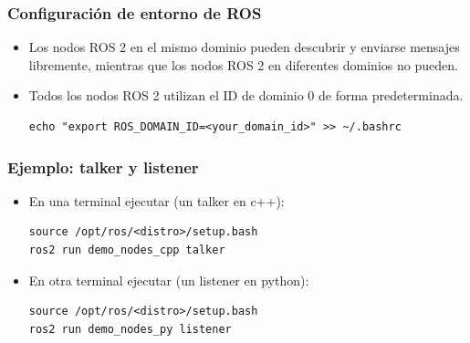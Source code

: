 \begin{frame}[fragile]
	\frametitle{Configuración de entorno de ROS}

\begin{itemize}
    \item Los nodos ROS 2 en el mismo dominio pueden descubrir y enviarse mensajes libremente, mientras que los nodos ROS 2 en diferentes dominios no pueden.

    \item Todos los nodos ROS 2 utilizan el ID de dominio 0 de forma predeterminada.
    
\begin{lstlisting}[style=bash]
echo "export ROS_DOMAIN_ID=<your_domain_id>" >> ~/.bashrc
\end{lstlisting}
\end{itemize}

\end{frame}

\begin{frame}[fragile]
	\frametitle{Ejemplo: talker y listener}
	
    \begin{itemize}
	   \item En una terminal ejecutar (un talker en c++):
\begin{lstlisting}[style=bash]
source /opt/ros/<distro>/setup.bash
ros2 run demo_nodes_cpp talker
\end{lstlisting}

	   \item En otra terminal ejecutar (un listener en python):
\begin{lstlisting}[style=bash]
source /opt/ros/<distro>/setup.bash
ros2 run demo_nodes_py listener
\end{lstlisting}
\end{itemize}

\end{frame}

